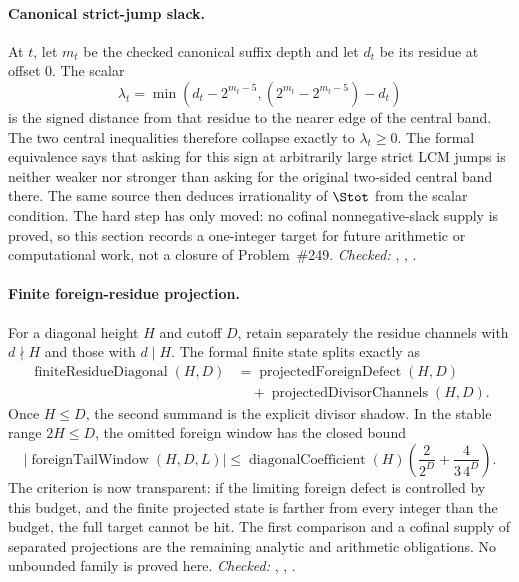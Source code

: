 \paragraph{Canonical strict-jump slack.}
At $t$, let $m_t$ be the checked canonical suffix depth and let
$d_t$ be its residue at offset $0$.  The scalar
\[
 \lambda_t=\min\!\left(d_t-2^{m_t-5},
       (2^{m_t}-2^{m_t-5})-d_t\right)
\]
is the signed distance from that residue to the nearer edge of the central
band.  The two central inequalities therefore collapse exactly to
$\lambda_t\ge0$.  The formal equivalence says that asking for this
sign at arbitrarily large strict LCM jumps is neither weaker nor stronger
than asking for the original two-sided central band there.  The same source
then deduces irrationality of $\Stot$ from the scalar condition.  The hard
step has only moved: no cofinal nonnegative-slack supply is proved, so this
section records a one-integer target for future arithmetic or computational
work, not a closure of Problem~\#249.
{\footnotesize\emph{Checked:}
,
,
.}

\paragraph{Finite foreign-residue projection.}
For a diagonal height $H$ and cutoff $D$, retain separately the residue
channels with $d\nmid H$ and those with $d\mid H$.  The formal finite state
splits exactly as
\[
 \begin{aligned}
 \operatorname{finiteResidueDiagonal}(H,D)
   &=\operatorname{projectedForeignDefect}(H,D)\\
   &\quad+\operatorname{projectedDivisorChannels}(H,D).
 \end{aligned}
\]
Once $H\le D$, the second summand is the explicit divisor shadow.  In the
stable range $2H\le D$, the omitted foreign window has the closed bound
\[
 \left|\operatorname{foreignTailWindow}(H,D,L)\right|
 \le \operatorname{diagonalCoefficient}(H)\left(
       \frac{2}{2^D}+\frac{4}{3\,4^D}\right).
\]
The criterion is now transparent: if the limiting foreign defect is
controlled by this budget, and the finite projected state is farther from
every integer than the budget, the full target cannot be hit.  The first
comparison and a cofinal supply of separated projections are the remaining
analytic and arithmetic obligations.  No unbounded family is proved here.
{\footnotesize\emph{Checked:}
,
,
.}

